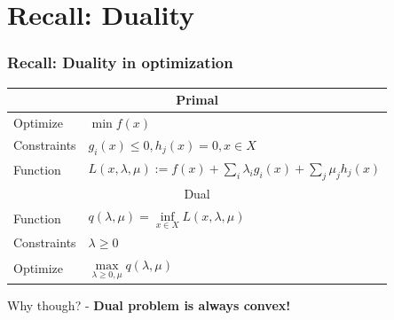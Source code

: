 \documentclass{beamer}
\begin{document}
\section{Recall: Duality}

\begin{frame}
\frametitle{Recall: Duality in optimization}





\end{frame}

\begin{frame}
\begin{tabular}{ll}
\toprule[1.5pt]
\multicolumn{2}{c}{Primal}\\\midrule
Optimize&$\min f(x)$\\\midrule
Constraints&$g_i(x)\le0, h_j(x)=0, x\in X$\\\midrule
Function&$L(x,\lambda,\mu):=f(x)+\sum_i\lambda_i g_i(x)+\sum_j\mu_j h_j(x)$\\\midrule
\multicolumn{2}{c}{Dual}\\\midrule
Function&$q(\lambda,\mu)=\inf\limits_{x\in X} L(x,\lambda,\mu)$\\\midrule
Constraints&$\lambda\ge0$\\\midrule
Optimize&$\max\limits_{\lambda\ge0,\mu} q(\lambda,\mu)$\\\midrule
\end{tabular}
\vspace{15pt}

Why though? - \textbf{Dual problem is always convex!}

\end{frame}
\end{document}
